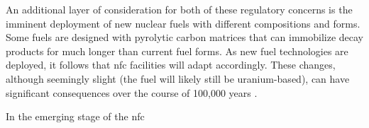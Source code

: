 An additional layer of consideration for both of these regulatory concerns is the imminent deployment of new nuclear fuels with different compositions and forms. Some fuels are designed with pyrolytic carbon matrices that can immobilize decay products for much longer than current fuel forms. As new fuel technologies are deployed, it follows that \gls{nfc} facilities will adapt accordingly. These changes, although seemingly slight (the fuel will likely still be uranium-based), can have significant consequences over the course of 100,000 years \cite{hyland_post_closure_2013}.


In the emerging stage of the \gls{nfc}









